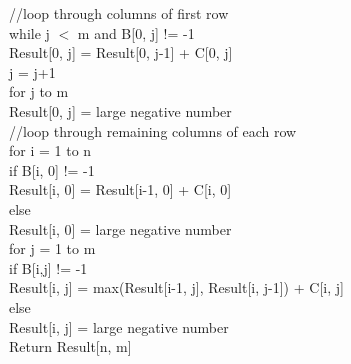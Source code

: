 \documentclass[11pt]{article}
\begin{document}
\begin{enumerate}
\begin{enumerate}[(a)]
					\hspace*{.5cm}
					//loop through columns of first row \\
					\hspace*{.5cm}
					while j $<$ m and B[0, j] != -1 \\
						\hspace*{1cm}
						Result[0, j] = Result[0, j-1] + C[0, j] \\
						\hspace*{1cm}
						j = j+1 \\
					\hspace*{.5cm}
					for j to m \\
						\hspace*{1cm}
						Result[0, j] = large negative number \\

					\hspace*{.5cm}
					//loop through remaining columns of each row \\
					\hspace*{.5cm}
					for i = 1 to n \\
						\hspace*{1cm}
						if B[i, 0] != -1 \\
							\hspace*{1.5cm}
							Result[i, 0] = Result[i-1, 0] + C[i, 0] \\
						\hspace*{1cm}
						else \\
							\hspace*{1.5cm}
							Result[i, 0] = large negative number \\
						\hspace*{1cm}
						for j = 1 to m \\
							\hspace*{1.5cm}
							if B[i,j] != -1 \\
								\hspace*{2cm}
								Result[i, j] = max(Result[i-1, j], Result[i, j-1]) + C[i, j] \\
							\hspace*{1.5cm}
							else \\
								\hspace*{2cm}
								Result[i, j] = large negative number \\
								
					\hspace*{.5cm}
					Return Result[n, m] \\
					

\end{enumerate}
\end{enumerate}
\end{document}
